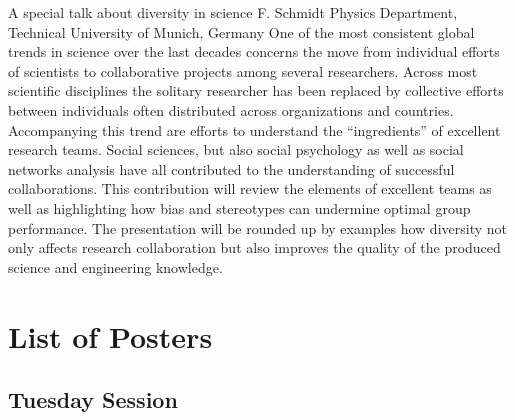 \documentclass[
	openany, %
	parskip=full, %
	12pt, %
	a4paper, %
]{conferencebooklet} %
\begin{document}
\abstract
	{A special talk about diversity in science} %
	{F. Schmidt} %
	{\ITtag} %
	{Physics Department, Technical University of Munich, Germany} %
	{One of the most consistent global trends in science over the last decades concerns the move from individual efforts of scientists to collaborative projects among several researchers. Across most scientific disciplines the solitary researcher has been replaced by collective efforts between individuals often distributed across organizations and countries. Accompanying this trend are efforts to understand the “ingredients” of excellent research teams. Social sciences, but also social psychology as well as social networks analysis have all contributed to the understanding of successful collaborations. This contribution will review the elements of excellent teams as well as highlighting how bias and stereotypes can undermine optimal group performance. The presentation will be rounded up by examples how diversity not only affects research collaboration but also improves the quality of the produced science and engineering knowledge.} %


\chapter{List of Posters} 

\vspace{-2.5em}

\section{Tuesday Session}
\end{document}
